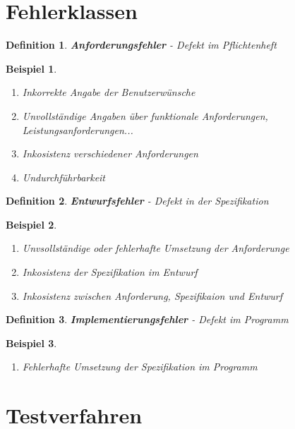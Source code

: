 \documentclass[a4paper]{article}
\theoremstyle{break}
\newtheorem{defi}{Definition}[section]
\newtheorem{ex}{Beispiel}[section]
\begin{document}
        \section{Fehlerklassen}
        \begin{defi}
          \textbf{Anforderungsfehler} - Defekt im Pflichtenheft
        \end{defi}
        \begin {ex}
          \begin{enumerate}
          \item Inkorrekte Angabe der Benutzerwünsche
          \item Unvollständige Angaben über funktionale Anforderungen, Leistungsanforderungen...
          \item Inkosistenz verschiedener Anforderungen
          \item Undurchführbarkeit
            \end{enumerate}
        \end{ex}
        \begin{defi}
          \textbf{Entwurfsfehler} - Defekt in der Spezifikation
        \end{defi}
        \begin{ex}
          \begin{enumerate}
          \item Unvsollständige oder fehlerhafte Umsetzung der Anforderunge
          \item Inkosistenz der Spezifikation im Entwurf
          \item Inkosistenz zwischen Anforderung, Spezifikaion und Entwurf
          \end {enumerate}
          \end{ex}
        \begin {defi}
          \textbf{Implementierungsfehler} - Defekt im Programm
        \end{defi}
        \begin{ex}
          \begin{enumerate}
          \item Fehlerhafte Umsetzung der Spezifikation im Programm
          \end{enumerate}
        \end{ex}

        
        \section{Testverfahren}
\end{document}
